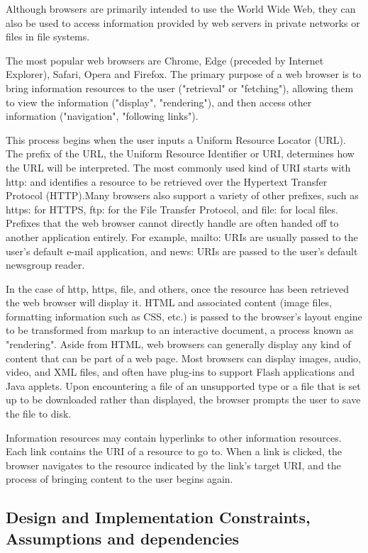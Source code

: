 \documentclass[BTech]{srmuthesis}
\begin{document}
Although browsers are primarily intended to use the World Wide Web, they can also be used to access information provided by web servers in private networks or files in file systems.

The most popular web browsers are Chrome, Edge (preceded by Internet Explorer), Safari, Opera and Firefox.
The primary purpose of a web browser is to bring information resources to the user ("retrieval" or "fetching"), allowing them to view the information ("display", "rendering"), and then access other information ("navigation", "following links").

This process begins when the user inputs a Uniform Resource Locator (URL). The prefix of the URL, the Uniform Resource Identifier or URI, determines how the URL will be interpreted. The most commonly used kind of URI starts with http: and identifies a resource to be retrieved over the Hypertext Transfer Protocol (HTTP).Many browsers also support a variety of other prefixes, such as https: for HTTPS, ftp: for the File Transfer Protocol, and file: for local files. Prefixes that the web browser cannot directly handle are often handed off to another application entirely. For example, mailto: URIs are usually passed to the user's default e-mail application, and news: URIs are passed to the user's default newsgroup reader.

In the case of http, https, file, and others, once the resource has been retrieved the web browser will display it. HTML and associated content (image files, formatting information such as CSS, etc.) is passed to the browser's layout engine to be transformed from markup to an interactive document, a process known as "rendering". Aside from HTML, web browsers can generally display any kind of content that can be part of a web page. Most browsers can display images, audio, video, and XML files, and often have plug-ins to support Flash applications and Java applets. Upon encountering a file of an unsupported type or a file that is set up to be downloaded rather than displayed, the browser prompts the user to save the file to disk.

Information resources may contain hyperlinks to other information resources. Each link contains the URI of a resource to go to. When a link is clicked, the browser navigates to the resource indicated by the link's target URI, and the process of bringing content to the user begins again.
\subsection{Design and Implementation Constraints, Assumptions and dependencies}
\end{document}

